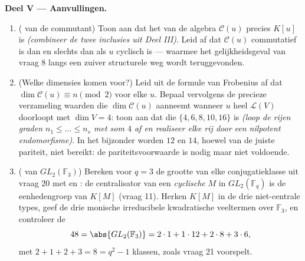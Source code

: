 \begin{problem}
\medskip
\noindent\textbf{Deel V --- Aanvullingen.}
\begin{enumerate}[resume]
  \item ( van de commutant) Toon aan dat het  van de
        algebra $\mathcal C(u)$ precies $K[u]$ is \emph{(combineer
        de twee inclusies uit Deel III)}. Leid af dat $\mathcal
        C(u)$ commutatief is dan en slechts dan als $u$ cyclisch is
        --- waarmee het gelijkheidsgeval van vraag 8 langs een
        zuiver structurele weg wordt teruggevonden.
  \item (Welke dimensies komen voor?) Leid uit de formule van
        Frobenius af dat $\dim\mathcal C(u) \equiv n \pmod 2$ voor
        elke $u$. Bepaal vervolgens de precieze verzameling waarden
        die $\dim \mathcal C(u)$ aanneemt wanneer $u$ heel
        $\mathcal L(V)$ doorloopt met $\dim V = 4$: toon aan dat
        die $\{4, 6, 8, 10, 16\}$ is \emph{(loop de rijen graden
        $n_1 \leq \dots \leq n_s$ met som $4$ af en realiseer elke
        rij door een nilpotent endomorfisme)}. In het bijzonder
        worden $12$ en $14$, hoewel van de juiste pariteit, niet
        bereikt: de pariteitsvoorwaarde is nodig maar niet
        voldoende.
  \item ( van $GL_2(\mathbb F_3)$) Bereken voor
        $q = 3$ de grootte van elke conjugatieklasse uit vraag 20
        met  en : de centralisator van een
        \emph{cyclische} $M$ in $GL_2(\mathbb F_q)$ is de
        eenhedengroep van $K[M]$ (vraag 11). Herken $K[M]$ in de
        drie niet-centrale types, geef de drie monische
        irreducibele kwadratische veeltermen over $\mathbb F_3$, en
        controleer de 
        \[
        48 = \abs{GL_2(\mathbb F_3)}
        = 2\cdot1 + 1\cdot12 + 2\cdot8 + 3\cdot6,
        \]
        met $2 + 1 + 2 + 3 = 8 = q^2 - 1$ klassen, zoals vraag 21
        voorspelt.
\end{enumerate}
\end{problem}
